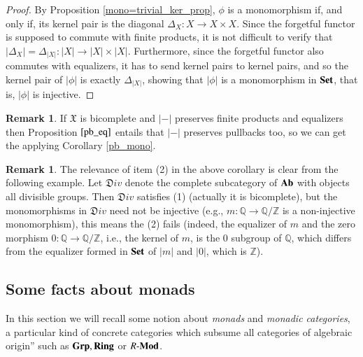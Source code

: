 \documentclass[12pt]{article}
\theoremstyle{definition}
\newtheorem{remark}[lemma]{Remark}
\def\Z{\mathbb Z}
\def\Q{\mathbb Q}
\def\X{\mathfrak X}
\newcommand{\Set}{\textbf{\textup{Set}}}
\newcommand{\Ab}{\textbf{\textup{Ab}}}
\newcommand{\Grp}{\textbf{\textup{Grp}}}
\newcommand{\Ring}{\textbf{\textup{Ring}}}
\newcommand{\Modu}{R\text{-}\textbf{\textup{Mod}}}
\numberwithin{equation}{section}
\begin{document}
\begin{proof}
	By Proposition \ref{mono=trivial_ker_prop}, $\phi$ is a monomorphism if, and only if, its kernel pair is the diagonal $\Delta_X\colon X\to X\times X$. Since the forgetful functor is supposed to commute with finite products, it is not difficult to verify that $|\Delta_X|=\Delta_{|X|}\colon |X|\to |X|\times |X|$. Furthermore, since the forgetful functor also commutes with equalizers, it has to send kernel pairs to kernel pairs, and so the kernel pair of $|\phi|$ is exactly $\Delta_{|X|}$, showing that $|\phi|$ is a monomorphism in $\Set$, that is, $|\phi|$ is injective.
\end{proof}
\begin{remark}If $\X$ is bicomplete and $|-|$ preserves finite products and equalizers then Proposition $\ref{pb_eq}$ entails that $|-|$ preserves pullbacks too, so we can get the applying Corollary \ref{pb_mono}.
\end{remark}
\begin{remark}\label{Div:vs:left:adjoint} 
	The relevance of item (2) in the above corollary is clear from the following example. Let $\mathfrak D iv$ denote the complete subcategory of $\Ab$ 
	with objects all divisible groups. Then $\mathfrak D iv$ satisfies (1) (actually it is bicomplete), but the monomorphisms in $\mathfrak D iv$ 
	need not be injective (e.g., $m: \Q \to \Q/\Z$ is a non-injective monomorphism), this means the (2) fails (indeed, the equalizer of $m$ and the zero morphism $0: \Q \to \Q/\Z$, 
	i.e., the kernel of $m$, is the 0 subgroup of $\Q$, which differs from the
 equalizer formed in $\Set$ of $|m|$ and $|0|$, which is $\Z$). 
\end{remark}
 
\subsection{Some facts about monads}\label{monads} \reversemarginpar {}\normalmarginpar 	{}

In this section we will recall some notion about \emph{monads} and \emph{monadic categories}, a particular kind of concrete categories which subsume all categories of algebraic origin'' such as $\Grp, \Ring$ or $\Modu$.
\end{document}
